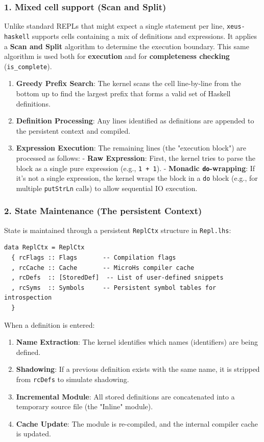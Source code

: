 \subsubsection{1. Mixed cell support (Scan and Split)}


Unlike standard REPLs that might expect a single statement per line, \texttt{xeus-haskell} supports cells containing a mix of definitions and expressions. It applies a \textbf{Scan and Split} algorithm to determine the execution boundary. This same algorithm is used both for \textbf{execution} and for \textbf{completeness checking} (\texttt{is\_complete}).


\begin{enumerate}
\item \textbf{Greedy Prefix Search}: The kernel scans the cell line-by-line from the bottom up to find the largest prefix that forms a valid set of Haskell definitions.
\item \textbf{Definition Processing}: Any lines identified as definitions are appended to the persistent context and compiled.
\item \textbf{Expression Execution}: The remaining lines (the "execution block") are processed as follows:
    - \textbf{Raw Expression}: First, the kernel tries to parse the block as a single pure expression (e.g., \texttt{1 + 1}).    - \textbf{Monadic \texttt{do}-wrapping}: If it's not a single expression, the kernel wraps the block in a \texttt{do} block (e.g., for multiple \texttt{putStrLn} calls) to allow sequential IO execution.\end{enumerate}


\subsubsection{2. State Maintenance (The persistent Context)}


State is maintained through a persistent \texttt{ReplCtx} structure in \texttt{Repl.lhs}:
\begin{verbatim}
data ReplCtx = ReplCtx
  { rcFlags :: Flags       -- Compilation flags
  , rcCache :: Cache       -- MicroHs compiler cache
  , rcDefs  :: [StoredDef]  -- List of user-defined snippets
  , rcSyms  :: Symbols     -- Persistent symbol tables for introspection
  }
\end{verbatim}


When a definition is entered:
\begin{enumerate}
\item \textbf{Name Extraction}: The kernel identifies which names (identifiers) are being defined.
\item \textbf{Shadowing}: If a previous definition exists with the same name, it is stripped from \texttt{rcDefs} to simulate shadowing.
\item \textbf{Incremental Module}: All stored definitions are concatenated into a temporary source file (the "Inline" module).
\item \textbf{Cache Update}: The module is re-compiled, and the internal compiler cache is updated.
\end{enumerate}


